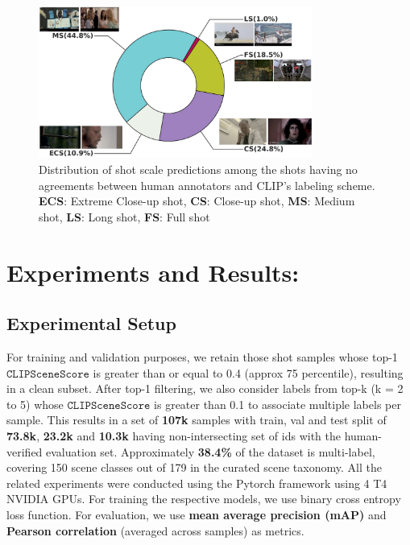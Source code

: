 \begin{figure}
    \centering
    \includegraphics[width=0.8\textwidth]{figures/Shot_type_distribution_discarded_shots.png}
    \caption{Distribution of shot scale predictions among the shots having no agreements between human annotators and CLIP's labeling scheme. \textbf{ECS}: Extreme Close-up shot, \textbf{CS}: Close-up shot, \textbf{MS}: Medium shot, \textbf{LS}: Long shot, \textbf{FS}: Full shot}
    \label{shot_type_distribution}
\end{figure}

\section{Experiments and Results:}

\subsection{Experimental Setup}
For training and validation purposes, we retain those shot samples whose top-1 $\texttt{CLIPSceneScore}$ is greater than or equal to 0.4 (approx 75 percentile), resulting in a clean subset. After top-1 filtering, we also consider labels from top-k (k = 2 to 5) whose $\texttt{CLIPSceneScore}$ is greater than 0.1 to associate multiple labels per sample.
This results in a set of \textbf{107k} samples with train, val and test split of \textbf{73.8k}, \textbf{23.2k} and \textbf{10.3k} having non-intersecting set of ids with the human-verified evaluation set. Approximately \textbf{38.4\%} of the dataset is multi-label, covering 150 scene classes out of 179 in the curated scene taxonomy. 
All the related experiments were conducted using the Pytorch\cite{Pytorch} framework using 4 T4 NVIDIA GPUs. For training the respective models, we use binary cross entropy loss function. For evaluation, we use \textbf{mean average precision (mAP)} and \textbf{Pearson correlation} (averaged across samples) as metrics.


